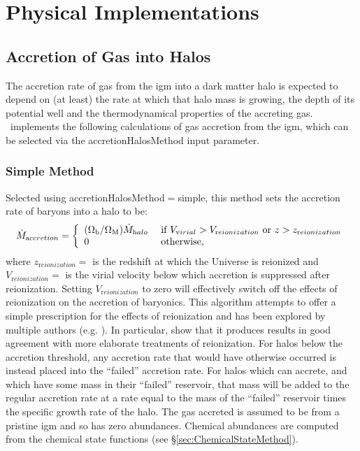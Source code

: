 \chapter{Physical Implementations}

\section{Accretion of Gas into Halos}\label{sec:AccretionBaryonic}

The accretion rate of gas from the \gls{igm} into a dark matter halo is expected to depend on (at least) the rate at which that halo mass is growing, the depth of its potential well and the thermodynamical properties of the accreting gas. \glc\ implements the following calculations of gas accretion from the \gls{igm}, which can be selected via the {\normalfont \ttfamily accretionHalosMethod} input parameter.

\subsection{Simple Method}

Selected using {\normalfont \ttfamily accretionHalosMethod}$=${\normalfont \ttfamily simple}, this method sets the accretion rate of baryons into a halo to be:
\begin{equation}
 \dot{M}_{\mathrm accretion} = \left\{ \begin{array}{ll} (\Omega_{\mathrm b}/\Omega_{\mathrm M}) \dot{M}_{\mathrm halo} & \hbox{ if } V_{\mathrm virial} > V_{\mathrm reionization} \hbox{ or } z > z_{\mathrm reionization} \\ 0 & \hbox{ otherwise,}\end{array} \right.
\end{equation}
where $z_{\mathrm reionization}=${\normalfont \ttfamily [reionizationSuppressionRedshift]} is the redshift at which the Universe is reionized and $V_{\mathrm reionization}=${\normalfont \ttfamily [reionizationSuppressionVelocity]} is the virial velocity below which accretion is suppressed after reionization. Setting $V_{\mathrm reionization}$ to zero will effectively switch off the effects of reionization on the accretion of baryonics. This algorithm attempts to offer a simple prescription for the effects of reionization and has been explored by multiple authors (e.g. \citealt{benson_effects_2002}). In particular, \cite{font_modelingmilky_2010} show that it produces results in good agreement with more elaborate treatments of reionization. For halos below the accretion threshold, any accretion rate that would have otherwise occurred is instead placed into the ``failed'' accretion rate. For halos which can accrete, and which have some mass in their ``failed'' reservoir, that mass will be added to the regular accretion rate at a rate equal to the mass of the 
``failed'' reservoir times the specific growth rate of the halo. The gas accreted is assumed to be from a pristine \gls{igm} and so has zero abundances. Chemical abundances are computed from the chemical state functions (see \S\ref{sec:ChemicalStateMethod}).

